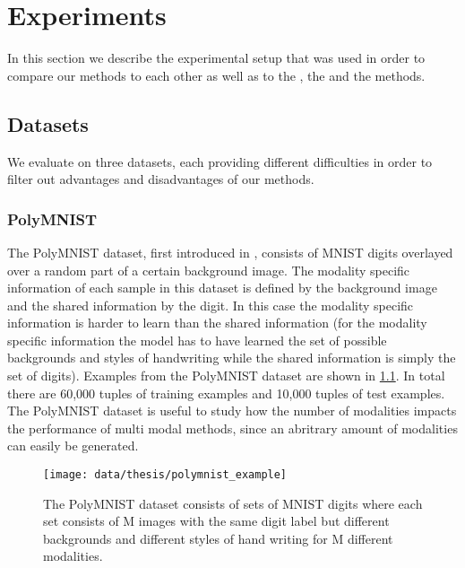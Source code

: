 \chapter{Experiments}
In this section we describe the experimental setup that was used in order to compare our methods to each other as well as to the , the  and the  methods.


\section{Datasets}
We evaluate on three datasets, each providing different difficulties in order to filter out advantages and disadvantages of our methods.

\subsection{PolyMNIST} \label{polymnist}
The PolyMNIST dataset, first introduced in \citep{sutter_generalized_2020}, consists of MNIST digits overlayed over a random part of a certain background image.
The modality specific information of each sample in this dataset is defined by the background image and the shared information by the digit.
In this case the modality specific information is harder to learn than the shared information (for the modality specific information the model has to have learned the set of possible backgrounds and styles of handwriting while the shared information is simply the set of digits).
Examples from the PolyMNIST dataset are shown in \cref{fig:PolyMNIST}.
In total there are 60,000 tuples of training examples and 10,000 tuples of test examples.
The PolyMNIST dataset is useful to study how the number of modalities impacts the performance of multi modal methods, since an abritrary amount of modalities can easily be generated.

\begin{figure}[h!]
    \centering
    \texttt{[image: data/thesis/polymnist\_example]}
    \caption{The PolyMNIST dataset consists of sets of MNIST
    digits where each set consists of M images
    with the same digit label but different backgrounds
    and different styles of hand writing for M different modalities.}
    \label{fig:PolyMNIST}
\end{figure}

